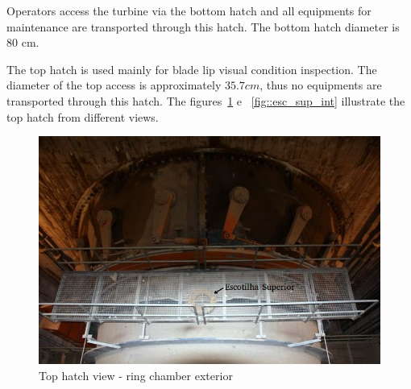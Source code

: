 Operators access the turbine via the bottom hatch and all equipments for
maintenance are transported through this hatch. The bottom hatch diameter is
80 cm.

The top hatch is used mainly for blade lip visual condition inspection. The
diameter of the top access is approximately $35.7cm$, thus no equipments
are transported through this hatch. The figures~\ref{fig::esc_sup_ext} e
~\ref{fig::esc_sup_int} illustrate the top hatch from different views.



\begin{figure}[h!]	
	\includegraphics[width=\columnwidth]{figs/viagem/2015_04_28/UG/img_4979_mod}
	\caption{Top hatch view - ring chamber exterior}
	\label{fig::esc_sup_ext}
\end{figure}

